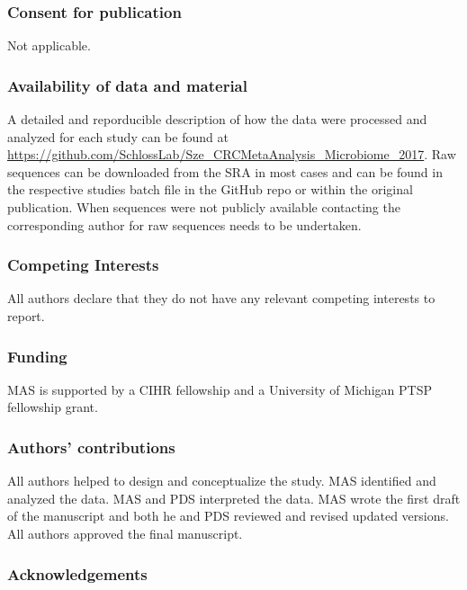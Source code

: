 \documentclass[12pt,]{article}
\begin{document}
\subsubsection{Consent for publication}\label{consent-for-publication}

Not applicable.

\subsubsection{Availability of data and
material}\label{availability-of-data-and-material}

A detailed and reporducible description of how the data were processed
and analyzed for each study can be found at
\url{https://github.com/SchlossLab/Sze_CRCMetaAnalysis_Microbiome_2017}.
Raw sequences can be downloaded from the SRA in most cases and can be
found in the respective studies batch file in the GitHub repo or within
the original publication. When sequences were not publicly available
contacting the corresponding author for raw sequences needs to be
undertaken.

\subsubsection{Competing Interests}\label{competing-interests}

All authors declare that they do not have any relevant competing
interests to report.

\subsubsection{Funding}\label{funding}

MAS is supported by a CIHR fellowship and a University of Michigan PTSP
fellowship grant.

\subsubsection{Authors' contributions}\label{authors-contributions}

All authors helped to design and conceptualize the study. MAS identified
and analyzed the data. MAS and PDS interpreted the data. MAS wrote the
first draft of the manuscript and both he and PDS reviewed and revised
updated versions. All authors approved the final manuscript.

\subsubsection{Acknowledgements}\label{acknowledgements}
\end{document}
